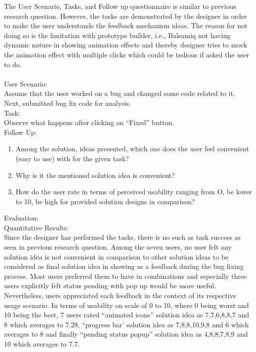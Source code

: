 The User Scenario, Tasks, and Follow up questionnaire is similar to previous research question. However, the tasks are demonstrated by the designer in order to make the user understands the feedback mechanism ideas. The reason for not doing so is the limitation with prototype builder, i.e., Balsamiq not having dynamic nature in showing animation effects and thereby designer tries to mock the animation effect with multiple clicks which could be tedious if asked the user to do. \\ \\

User Scenario: \\

Assume that the user worked on a bug and changed some code related to it. Next, submitted bug fix code for analysis. \\

Task: \\

Observe what happens after clicking on “Fixed” button. \\

Follow Up: \\

\begin{enumerate}
\item Among the solution, ideas presented, which one does the user feel convenient (easy to use) with for the given task?
\item Why is it the mentioned solution idea is convenient?
\item How do the user rate in terms of perceived usability ranging from O, be lower to 10, be high for provided solution designs in comparison?
\end{enumerate}

Evaluation: \\

Quantitative Results: \\

Since the designer has performed the tasks, there is no such as task success as seen in previous research question. Among the seven users, no user felt any solution idea is not convenient in comparison to other solution ideas to be considered as final solution idea in showing as a feedback during the bug fixing process.  Most users preferred them to have in combinations and especially three users explicitly felt status pending with pop up would be more useful. Nevertheless, users appreciated each feedback in the context of its respective usage scenario. In terms of usability on scale of 0 to 10, where 0 being worst and 10 being the best, 7 users rated “animated icons” solution idea as 7,7,6,8,8,7 and 8 which averages to 7.28, “progress bar’ solution idea as 7,8,8,10,9,8 and 6 which averages to 8 and finally “pending status popup” solution idea as 4,8,8,7,8,9 and 10 which averages to 7.7. \\

